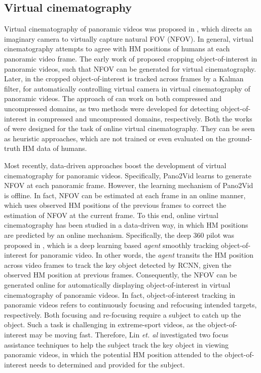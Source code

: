 \documentclass[10pt,journal,compsoc]{IEEEtran}
\begin{document}
\subsection{Virtual cinematography}
Virtual cinematography of panoramic videos was proposed in \cite{foote2000flycam, sun2005region, su2016pano2vid, hu2017deep, lin2017tell}, which directs an imaginary camera to virtually capture natural FOV (NFOV). In general, virtual cinematography attempts to agree with HM positions of humans at each panoramic video frame. The early work of \cite{foote2000flycam} proposed cropping object-of-interest in panoramic videos, such that NFOV can be generated for virtual cinematography. Later, in \cite{sun2005region} the cropped object-of-interest is tracked across frames by a Kalman filter, for automatically controlling virtual camera in virtual cinematography of panoramic videos. The approach of \cite{sun2005region} can work on both compressed and uncompressed domains, as two methods were developed for detecting object-of-interest in compressed and uncompressed domains, respectively. Both the works of \cite{foote2000flycam, sun2005region} were designed for the task of online virtual cinematography. They can be seen as heuristic approaches, which are not trained or even evaluated on the ground-truth HM data of humans.

Most recently, data-driven approaches boost the development of virtual cinematography for panoramic videos. Specifically, Pano2Vid \cite{su2016pano2vid} learns to generate NFOV at each panoramic frame. However, the learning mechanism of Pano2Vid is offline. In fact, NFOV can be estimated at each frame in an online manner, which uses observed HM positions of the previous frames to correct the estimation of NFOV at the current frame. To this end, online virtual cinematography has been studied \cite{hu2017deep, lin2017tell} in a data-driven way, in which HM positions are predicted by an online mechanism.
Specifically, the deep 360 pilot was proposed in \cite{hu2017deep}, which is a deep learning based \textit{agent} smoothly tracking object-of-interest for panoramic video. In other words, the \textit{agent} transits the HM position across video frames to track the key object detected by RCNN, given the observed HM position at previous frames. Consequently, the NFOV can be generated online for automatically displaying object-of-interest in virtual cinematography of panoramic videos. In fact, object-of-interest tracking in panoramic videos refers to continuously focusing and refocusing intended targets, respectively. Both focusing and re-focusing require a subject to catch up the object. Such a task is challenging in extreme-sport videos, as the object-of-interest may be moving fast. Therefore, Lin \textit{et. al} \cite{lin2017tell} investigated two focus assistance techniques to help the subject track the key object in viewing panoramic videos, in which the potential HM position attended to the object-of-interest needs to determined and provided for the subject.
\end{document}
